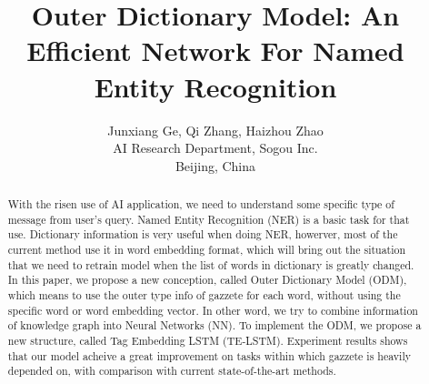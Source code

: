 \documentclass[letterpaper]{article} %
\title{ Outer Dictionary Model: An Efficient Network For Named Entity Recognition }
\author{Junxiang Ge, Qi Zhang, Haizhou Zhao\\ 
AI Research Department, Sogou Inc. \\
Beijing, China}
\begin{document}
\maketitle

\begin{abstract}
With the risen use of AI application, we need to understand some specific type of message from user's query. Named Entity Recognition (NER) is a basic task for that use. Dictionary information is very useful when doing NER, howerver, most of the current method use it in word embedding format, which will bring out the situation that we need to retrain model when the list of words in dictionary is greatly changed. In this paper, we propose a new conception, called Outer Dictionary Model (ODM), which means to use the outer type info of gazzete for each word, without using the specific word or word embedding vector. In other word, we try to combine information of knowledge graph into Neural Networks (NN). To implement the ODM, we propose a new structure, called Tag Embedding LSTM (TE-LSTM). Experiment results shows that our model acheive a great improvement on tasks within which gazzete is heavily depended on, with comparison with current state-of-the-art methods. 
\end{abstract}
\end{document}
